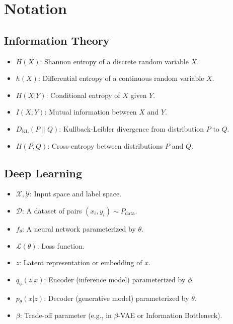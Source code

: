 \chapter*{Notation}

\section*{Information Theory}
\begin{itemize}
    \item $H(X)$: Shannon entropy of a discrete random variable $X$.
    \item $h(X)$: Differential entropy of a continuous random variable $X$.
    \item $H(X|Y)$: Conditional entropy of $X$ given $Y$.
    \item $I(X; Y)$: Mutual information between $X$ and $Y$.
    \item $D_{\text{KL}}(P \parallel Q)$: Kullback-Leibler divergence from distribution $P$ to $Q$.
    \item $H(P, Q)$: Cross-entropy between distributions $P$ and $Q$.
\end{itemize}

\section*{Deep Learning}
\begin{itemize}
    \item $\mathcal{X}, \mathcal{Y}$: Input space and label space.
    \item $\mathcal{D}$: A dataset of pairs $(x_i, y_i) \sim P_{\text{data}}$.
    \item $f_\theta$: A neural network parameterized by $\theta$.
    \item $\mathcal{L}(\theta)$: Loss function.
    \item $z$: Latent representation or embedding of $x$.
    \item $q_\phi(z|x)$: Encoder (inference model) parameterized by $\phi$.
    \item $p_\theta(x|z)$: Decoder (generative model) parameterized by $\theta$.
    \item $\beta$: Trade-off parameter (e.g., in $\beta$-VAE or Information Bottleneck).
\end{itemize}
